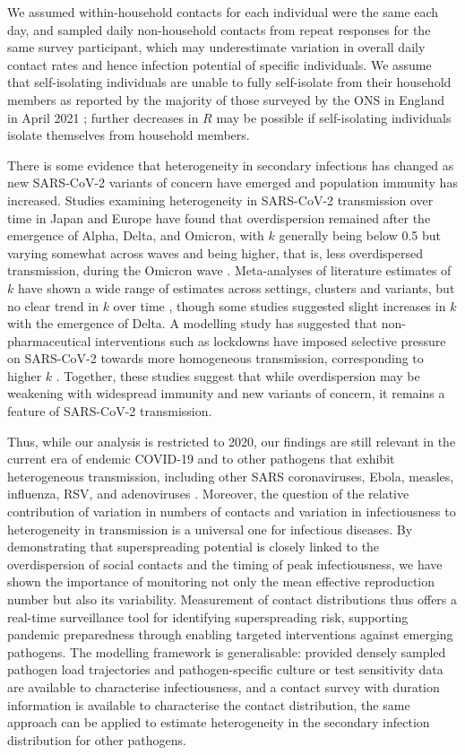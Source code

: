 \documentclass[
  10pt,
  letterpaper,
]{article}
\begin{document}
We assumed within-household contacts for each individual were the same
each day, and sampled daily non-household contacts from repeat responses
for the same survey participant, which may underestimate variation in
overall daily contact rates and hence infection potential of specific
individuals. We assume that self-isolating individuals are unable to
fully self-isolate from their household members as reported by the
majority of those surveyed by the ONS in England in April 2021
\citep{ons2021}; further decreases in \(R\) may be possible if
self-isolating individuals isolate themselves from household members.

There is some evidence that heterogeneity in secondary infections has
changed as new SARS-CoV-2 variants of concern have emerged and
population immunity has increased. Studies examining heterogeneity in
SARS-CoV-2 transmission over time in Japan and Europe have found that
overdispersion remained after the emergence of Alpha, Delta, and
Omicron, with \(k\) generally being below 0.5 but varying somewhat
across waves and being higher, that is, less overdispersed transmission,
during the Omicron wave \citep{ko2023, hodcroft2025}. Meta-analyses of
literature estimates of \(k\) have shown a wide range of estimates
across settings, clusters and variants, but no clear trend in \(k\) over
time \citep{du2022, wegehaupt2023}, though some studies suggested slight
increases in \(k\) with the emergence of Delta. A modelling study has
suggested that non-pharmaceutical interventions such as lockdowns have
imposed selective pressure on SARS-CoV-2 towards more homogeneous
transmission, corresponding to higher \(k\) \citep{nielsen2022}.
Together, these studies suggest that while overdispersion may be
weakening with widespread immunity and new variants of concern, it
remains a feature of SARS-CoV-2 transmission.

Thus, while our analysis is restricted to 2020, our findings are still
relevant in the current era of endemic COVID-19 and to other pathogens
that exhibit heterogeneous transmission, including other SARS
coronaviruses, Ebola, measles, influenza, RSV, and adenoviruses
\citep{goyal2021, leung2021, lloydsmith2005}. Moreover, the question of
the relative contribution of variation in numbers of contacts and
variation in infectiousness to heterogeneity in transmission is a
universal one for infectious diseases. By demonstrating that
superspreading potential is closely linked to the overdispersion of
social contacts and the timing of peak infectiousness, we have shown the
importance of monitoring not only the mean effective reproduction number
but also its variability. Measurement of contact distributions thus
offers a real-time surveillance tool for identifying superspreading
risk, supporting pandemic preparedness through enabling targeted
interventions against emerging pathogens. The modelling framework is
generalisable: provided densely sampled pathogen load trajectories and
pathogen-specific culture or test sensitivity data are available to
characterise infectiousness, and a contact survey with duration
information is available to characterise the contact distribution, the
same approach can be applied to estimate heterogeneity in the secondary
infection distribution for other pathogens.
\end{document}
